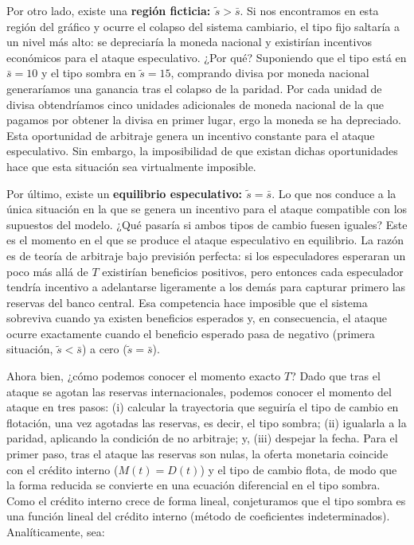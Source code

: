 \documentclass[10pt,a4paper]{article}
\begin{document}
Por otro lado, existe una \textbf{región ficticia: $\tilde s>\bar s$}. Si nos encontramos en esta región del gráfico y ocurre el colapso del sistema cambiario, el tipo fijo saltaría a un nivel más alto: se depreciaría la moneda nacional y existirían incentivos económicos para el ataque especulativo. ¿Por qué? Suponiendo que el tipo está en $\bar s=10$ y el tipo sombra en $\tilde s=15$, comprando divisa por moneda nacional generaríamos una ganancia tras el colapso de la paridad. Por cada unidad de divisa obtendríamos cinco unidades adicionales de moneda nacional de la que pagamos por obtener la divisa en primer lugar, ergo la moneda se ha depreciado. Esta oportunidad de arbitraje genera un incentivo constante para el ataque especulativo. Sin embargo, la imposibilidad de que existan dichas oportunidades hace que esta situación sea virtualmente imposible.

Por último, existe un \textbf{equilibrio especulativo: $\tilde s=\bar s$}. Lo que nos conduce a la única situación en la que se genera un incentivo para el ataque compatible con los supuestos del modelo. ¿Qué pasaría si ambos tipos de cambio fuesen iguales? Este es el momento en el que se produce el ataque especulativo en equilibrio. La razón es de teoría de arbitraje bajo previsión perfecta: si los especuladores esperaran un poco más allá de $T$ existirían beneficios positivos, pero entonces cada especulador tendría incentivo a adelantarse ligeramente a los demás para capturar primero las reservas del banco central. Esa competencia hace imposible que el sistema sobreviva cuando ya existen beneficios esperados y, en consecuencia, el ataque ocurre exactamente cuando el beneficio esperado pasa de negativo (primera situación, $\tilde s<\bar s$) a cero ($\tilde s=\bar s$).

Ahora bien, ¿cómo podemos conocer el momento exacto $T$? Dado que tras el ataque se agotan las reservas internacionales, podemos conocer el momento del ataque en tres pasos: (i) calcular la trayectoria que seguiría el tipo de cambio en flotación, una vez agotadas las reservas, es decir, el tipo sombra; (ii) igualarla a la paridad, aplicando la condición de no arbitraje; y, (iii) despejar la fecha. Para el primer paso, tras el ataque las reservas son nulas, la oferta monetaria coincide con el crédito interno ($M(t)=D(t)$) y el tipo de cambio flota, de modo que la forma reducida se convierte en una ecuación diferencial en el tipo sombra. Como el crédito interno crece de forma lineal, conjeturamos que el tipo sombra es una función lineal del crédito interno (método de coeficientes indeterminados). Analíticamente, sea:
\end{document}
